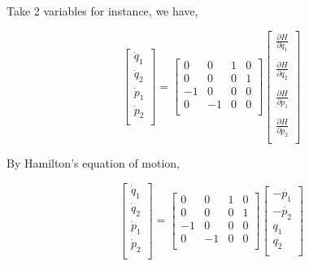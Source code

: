 \documentclass[12pt]{article}
\begin{document}
Take 2 variables for instance, we have,

\begin{center}
    \[ \begin{bmatrix}
        \dot{q}_1\\
        \dot{q}_2\\
        \dot{p}_1\\
        \dot{p}_2\\
    \end{bmatrix} = \begin{bmatrix}
        0 & 0 & 1 & 0\\
        0 & 0 & 0 & 1\\
        -1 & 0 & 0 & 0\\
        0 & -1 & 0 & 0\\
    \end{bmatrix} \begin{bmatrix}
        \frac{\partial H}{\partial q_1}\\\\
        \frac{\partial H}{\partial q_2}\\\\
        \frac{\partial H}{\partial p_1}\\\\
        \frac{\partial H}{\partial p_2}\\
    \end{bmatrix} \]
\end{center}

By Hamilton's equation of motion, 

\begin{center}
    \[ \begin{bmatrix}
        \dot{q}_1\\
        \dot{q}_2\\
        \dot{p}_1\\
        \dot{p}_2\\
    \end{bmatrix} = \begin{bmatrix}
        0 & 0 & 1 & 0\\
        0 & 0 & 0 & 1\\
        -1 & 0 & 0 & 0\\
        0 & -1 & 0 & 0\\
    \end{bmatrix} \begin{bmatrix}
        -\dot{p_1}\\
        -\dot{p_2}\\
        q_1\\
        q_2\\
    \end{bmatrix} \]
\end{center}
\end{document}

